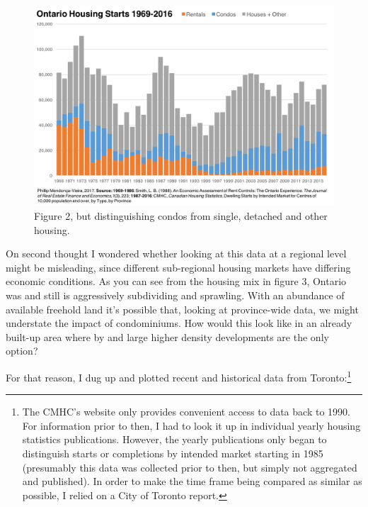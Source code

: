 \begin{figure}[ht]
\centering 
\includegraphics[width=\textwidth]{Ontario_Housing_Starts_1969-2016_With_Condos.png}
\caption[Ontario Housing Starts by Intended Market and Condos 1969-2016]{Figure 2, but distinguishing condos from single, detached and other housing.
}
\label{fig:figure3} 
\end{figure}

On second thought I wondered whether looking at this data at a regional level might be misleading, since different sub-regional housing markets have differing economic conditions. As you can see from the housing mix in figure 3, Ontario was and still is aggressively subdividing and sprawling. With an abundance of available freehold land it's possible that, looking at province-wide data, we might understate the impact of condominiums. How would this look like in an already built-up area where by and large higher density developments are the only option? 

For that reason, I dug up and plotted recent and historical data from Toronto:\footnote{\label{^note-digging} The CMHC's website only provides convenient access to data back to 1990. For information prior to then, I had to look it up in individual yearly housing statistics publications. However, the yearly publications only began to distinguish starts or completions by intended market starting in 1985 (presumably this data was collected prior to then, but simply not aggregated and published). In order to make the time frame being compared as similar as possible, I relied on a City of Toronto report.}

\clearpage

